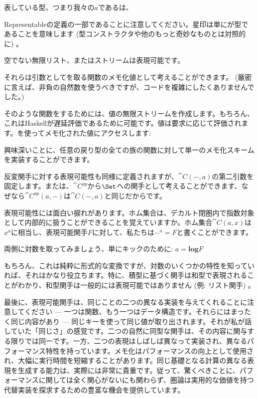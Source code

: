 表している型、つまり我々の$a$であるは、\code

{Representable}の定義の一部であることに注意してください。星印は単にが型であることを意味します (型コンストラクタや他のもっと奇妙なものとは対照的に) 。

空でない無限リスト、またはストリームは表現可能です。

それらは引数としてを取る関数のメモ化値として考えることができます。 (厳密に言えば、非負の自然数を使うべきですが、コードを複雑にしたくありませんでした。) 

そのような関数をするためには、値の無限ストリームを作成します。もちろん、これはHaskellが遅延評価であるために可能です。値は要求に応じて評価されます。を使ってメモ化された値にアクセスします: 

興味深いことに、任意の戻り型の全ての族の関数に対して単一のメモ化スキームを実装することができます。

反変関手に対する表現可能性も同様に定義されますが、$\cat{C}(-, a)$の第二引数を固定します。または、$\cat{C}^\mathit{op}$から$\Set$への関手として考えることができます、なぜなら$\cat{C}^\mathit{op}(a, -)$は$\cat{C}(-, a)$と同じだからです。

表現可能性には面白い捩れがあります。ホム集合は、デカルト閉圏内で指数対象として内部的に扱うことができることを覚えていますか。ホム集合$\cat{C}(a, x)$は$x^a$に相当し、表現可能関手$F$に対して、私たちは$-^a = F$と書くことができます。

両側に対数を取ってみましょう、単にキックのために: $a = \mathbf{log}F$

もちろん、これは純粋に形式的な変換ですが、対数のいくつかの特性を知っていれば、それはかなり役立ちます。特に、積型に基づく関手は和型で表現されることがわかり、和型関手は一般的には表現可能ではありません (例: リスト関手) 。

最後に、表現可能関手は、同じことの二つの異なる実装を与えてくれることに注意してください --- 一つは関数、もう一つはデータ構造です。それらにはまったく同じ内容があり --- 同じキーを使って同じ値が取り出されます。それが私が話していた「同じさ」の感覚です。二つの自然に同型な関手は、その内容に関与する限りでは同一です。一方、二つの表現はしばしば異なって実装され、異なるパフォーマンス特性を持っています。メモ化はパフォーマンスの向上として使用され、大幅に実行時間を短縮することがあります。同じ基礎となる計算の異なる表現を生成する能力は、実際には非常に貴重です。従って、驚くべきことに、パフォーマンスに関しては全く関心がないにも関わらず、圏論は実用的な価値を持つ代替実装を探求するための豊富な機会を提供しています。

